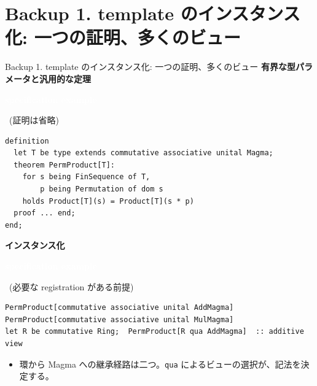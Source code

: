 \documentclass[dvipdfmx,aspectratio=169,11pt]{beamer}
\newcommand{\statusbadge}[2]{\colorbox{#1}{\textcolor{white}{\strut\scriptsize\sffamily\bfseries #2}}}
\newcommand{\badgeSpec}{\statusbadge{green!35!black}{specification example}}
\begin{document}
\appendix
\section{Backup 1. template のインスタンス化: 一つの証明、多くのビュー}
\begin{frame}[fragile,t]{Backup 1. template のインスタンス化: 一つの証明、多くのビュー}
\smallskip
\textbf{有界な型パラメータと汎用的な定理}~\badgeSpec~{\footnotesize(証明は省略)}
\begin{lstlisting}[language={mizar},basicstyle=\ttfamily\footnotesize]
definition
  let T be type extends commutative associative unital Magma;
  theorem PermProduct[T]:
    for s being FinSequence of T,
        p being Permutation of dom s
    holds Product[T](s) = Product[T](s * p)
  proof ... end;
end;
\end{lstlisting}
\smallskip
\textbf{インスタンス化}~\badgeSpec~{\footnotesize(必要な registration がある前提)}
\begin{lstlisting}[language={mizar},basicstyle=\ttfamily\small]
PermProduct[commutative associative unital AddMagma]
PermProduct[commutative associative unital MulMagma]
let R be commutative Ring;  PermProduct[R qua AddMagma]  :: additive view
\end{lstlisting}
\begin{itemize}
\setlength{\itemsep}{1pt}
\setlength{\parsep}{0pt}
\setlength{\parskip}{0pt}
\item 環から Magma への継承経路は二つ。\texttt{qua} によるビューの選択が、記法を決定する。
\end{itemize}
\end{frame}
\end{document}
